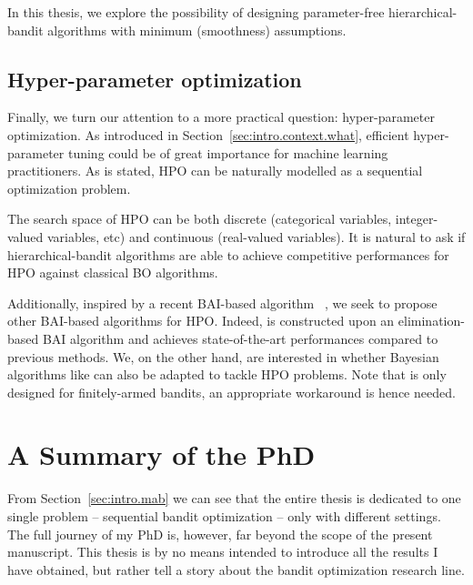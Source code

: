 In this thesis, we explore the possibility of designing parameter-free hierarchical-bandit algorithms with minimum (smoothness) assumptions.


\subsection{Hyper-parameter optimization}\label{sec:intro.mab.hpo}

Finally, we turn our attention to a more practical question: hyper-parameter optimization. As introduced in Section~\ref{sec:intro.context.what}, efficient hyper-parameter tuning could be of great importance for machine learning practitioners. As is stated, HPO can be naturally modelled as a sequential optimization problem.

The search space of HPO can be both discrete (categorical variables, integer-valued variables, etc) and continuous (real-valued variables). It is natural to ask if hierarchical-bandit algorithms are able to achieve competitive performances for HPO against classical BO algorithms.

Additionally, inspired by a recent BAI-based algorithm \Hyperband~\citep{li2017hyperband}, we seek to propose other BAI-based algorithms for HPO. Indeed, \Hyperband is constructed upon an elimination-based BAI algorithm and achieves state-of-the-art performances compared to previous methods. We, on the other hand, are interested in whether Bayesian algorithms like \TTTS can also be adapted to tackle HPO problems. Note that \TTTS is only designed for \gls{finitely-armed bandits}, an appropriate workaround is hence needed.

\section{A Summary of the PhD}\label{sec:intro.contributions}

From Section~\ref{sec:intro.mab} we can see that the entire thesis is dedicated to one single problem -- sequential bandit optimization -- only with different settings. The full journey of my PhD is, however, far beyond the scope of the present manuscript. This thesis is by no means intended to introduce all the results I have obtained, but rather tell a story about the bandit optimization research line. 

